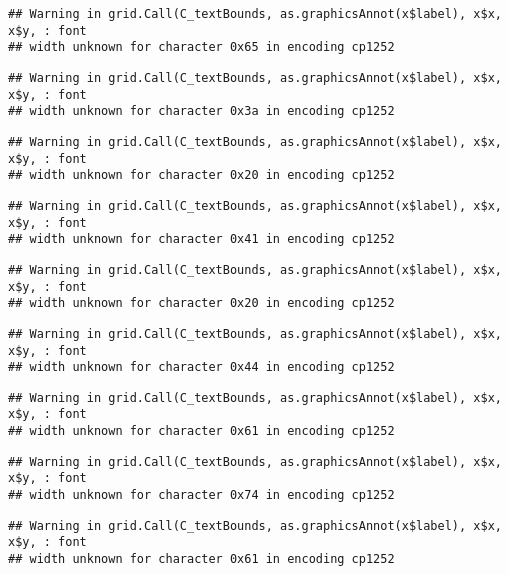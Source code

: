 \documentclass[
]{article}
\begin{document}
\begin{verbatim}
## Warning in grid.Call(C_textBounds, as.graphicsAnnot(x$label), x$x, x$y, : font
## width unknown for character 0x65 in encoding cp1252
\end{verbatim}

\begin{verbatim}
## Warning in grid.Call(C_textBounds, as.graphicsAnnot(x$label), x$x, x$y, : font
## width unknown for character 0x3a in encoding cp1252
\end{verbatim}

\begin{verbatim}
## Warning in grid.Call(C_textBounds, as.graphicsAnnot(x$label), x$x, x$y, : font
## width unknown for character 0x20 in encoding cp1252
\end{verbatim}

\begin{verbatim}
## Warning in grid.Call(C_textBounds, as.graphicsAnnot(x$label), x$x, x$y, : font
## width unknown for character 0x41 in encoding cp1252
\end{verbatim}

\begin{verbatim}
## Warning in grid.Call(C_textBounds, as.graphicsAnnot(x$label), x$x, x$y, : font
## width unknown for character 0x20 in encoding cp1252
\end{verbatim}

\begin{verbatim}
## Warning in grid.Call(C_textBounds, as.graphicsAnnot(x$label), x$x, x$y, : font
## width unknown for character 0x44 in encoding cp1252
\end{verbatim}

\begin{verbatim}
## Warning in grid.Call(C_textBounds, as.graphicsAnnot(x$label), x$x, x$y, : font
## width unknown for character 0x61 in encoding cp1252
\end{verbatim}

\begin{verbatim}
## Warning in grid.Call(C_textBounds, as.graphicsAnnot(x$label), x$x, x$y, : font
## width unknown for character 0x74 in encoding cp1252
\end{verbatim}

\begin{verbatim}
## Warning in grid.Call(C_textBounds, as.graphicsAnnot(x$label), x$x, x$y, : font
## width unknown for character 0x61 in encoding cp1252
\end{verbatim}
\end{document}
